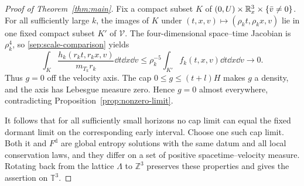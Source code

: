 \begin{proof}[Proof of Theorem~\ref{thm:main}]
Fix a compact subset \(K\) of
\((0,U)\times\mathbb R^3_x\times\{\bar v\ne0\}\).
For all sufficiently large \(k\), the images of \(K\) under
\((t,x,v)\mapsto(\rho_kt,\rho_kx,v)\) lie in one fixed compact
subset \(K'\) of \(\mathcal V\). The four-dimensional
space--time Jacobian is \(\rho_k^4\), so
\eqref{sep:scale-comparison} yields
\[
 \int_K\frac{h_k(r_kt,r_kx,v)}{m_{T_k}r_k}\dd t\dd x\dd v
 \le\rho_k^{-5}\int_{K'}f_k(t,x,v)\dd t\dd x\dd v
 \longrightarrow0.
\]
Thus \(g=0\) off the velocity axis. The cap
\(0\le g\le(t+l)H\) makes \(g\) a density, and the axis has
Lebesgue measure zero. Hence \(g=0\) almost everywhere, contradicting
Proposition~\ref{prop:nonzero-limit}.

It follows that for all sufficiently small horizons no cap limit can
equal the fixed dormant limit on the corresponding early interval.
Choose one such cap limit. Both it and \(F^{\mathrm d}\) are global
entropy solutions with the same datum and all local conservation laws,
and they differ on a set of positive spacetime--velocity measure.
Rotating back from the lattice \(\Lambda\) to \(\mathbb Z^3\)
preserves these properties and gives the assertion on \(\mathbb T^3\).
\end{proof}
